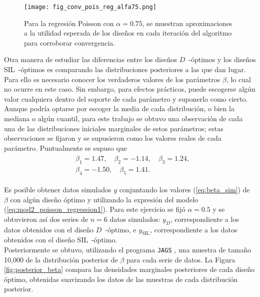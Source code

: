 \begin{figure}[h]
	\centering
    \texttt{[image: fig\_conv\_pois\_reg\_alfa75.png]}
    \caption{Para la regresión Poisson con $\alpha = 0.75$, se muestran aproximaciones a la utilidad esperada de los diseños en cada iteración del algoritmo para corroborar convergencia.}
    \label{fig:pois_reg_conv_alfa75}
\end{figure}


\FloatBarrier



Otra manera de estudiar las diferencias entre los diseños $D$~-óptimos y los diseños SIL~-óptimos es comparando las distribuciones posteriores a las que dan lugar. Para ello es necesario conocer los verdaderos valores de los parámetros $\beta$, lo cual no ocurre en este caso. Sin embargo, para efectos prácticos, puede escogerse algún valor cualquiera dentro del soporte de cada parámetro y suponerlo como cierto. Aunque podría optarse por escoger la media de cada distribución, o bien la mediana o algún cuantil, para este trabajo se obtuvo una observación de cada una de las distribuciones iniciales marginales de estos parámetros; estas observaciones se fijaron y se supusieron como los valores reales de cada parámetro. Puntualmente se supuso que
\begin{align} \label{eq:beta_sim}
\begin{split}
	&\beta_1 = 1.47, \quad \beta_2 = -1.14, \quad \beta_3 = 1.24, \\
    &\beta_4 = -1.50, \quad \beta_5 = 1.41.
\end{split}
\end{align}

Es posible obtener datos simulados $y$ conjuntando los valores (\ref{eq:beta_sim}) de $\beta$ con algún diseño óptimo y utilizando la expresión del modelo (\ref{eq:mod2_poisson_regression1}). Para este ejercicio se fijó $\alpha = 0.5$ y se obtuvieron así dos series de $n=6$ datos simulados: $y_D$, correspondiente a los datos obtenidos con el diseño $D$~-óptimo, e $y_{\text{SIL}}$, correspondiente a los datos obtenidos con el diseño SIL~-óptimo. \\


Posteriormente se obtuvo, utilizando el programa \texttt{JAGS} \citep{jags}, una muestra de tamaño 10,000 de la distribución posterior de $\beta$ para cada serie de datos. La Figura \ref{fig:posterior_beta} compara las densidades marginales posteriores de cada diseño óptimo, obtenidas suavizando los datos de las muestras de cada distribución posterior. \\


